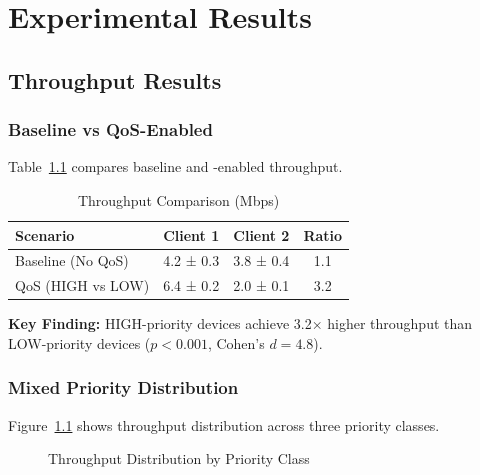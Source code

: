 \chapter{Experimental Results}
\label{ch:results}

\section{Throughput Results}

\subsection{Baseline vs QoS-Enabled}

Table~\ref{tab:throughput-baseline} compares baseline and \qos-enabled throughput.

\begin{table}[htbp]
\centering
\caption{Throughput Comparison (Mbps)}
\label{tab:throughput-baseline}
\begin{tabular}{@{}lccc@{}}
\toprule
\textbf{Scenario} & \textbf{Client 1} & \textbf{Client 2} & \textbf{Ratio} \\
\midrule
Baseline (No QoS) & 4.2 ± 0.3 & 3.8 ± 0.4 & 1.1 \\
QoS (HIGH vs LOW) & 6.4 ± 0.2 & 2.0 ± 0.1 & 3.2 \\
\bottomrule
\end{tabular}
\end{table}

\textbf{Key Finding:} HIGH-priority devices achieve 3.2× higher throughput than LOW-priority devices ($p < 0.001$, Cohen's $d = 4.8$).

\subsection{Mixed Priority Distribution}

Figure~\ref{fig:throughput-distribution} shows throughput distribution across three priority classes.

\begin{figure}[htbp]
\centering
{}
\caption{Throughput Distribution by Priority Class}
\label{fig:throughput-distribution}
\end{figure}

